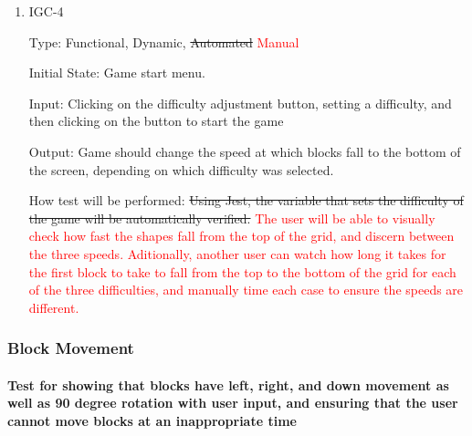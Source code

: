 \documentclass[12pt, titlepage]{article}
\begin{document}
\begin{enumerate}
\item{IGC-4\\}

Type: Functional, Dynamic, \sout{Automated} \textcolor{red}{Manual}
					
Initial State: Game start menu.
					
Input: Clicking on the difficulty adjustment button, setting a difficulty, and then clicking on the button to start the game
					
Output: Game should change the speed at which blocks fall to the bottom of the screen, depending on which difficulty was selected.
					
How test will be performed: \sout{Using Jest, the variable that sets the difficulty of the game will be automatically verified.} \textcolor{red}{The user will be able to visually check how fast the shapes fall from the top of the grid, and discern between the three speeds. Aditionally, another user can watch how long it takes for the first block to take to fall from the top to the bottom of the grid for each of the three difficulties, and manually time each case to ensure the speeds are different.}

\end{enumerate}
\subsubsection{Block Movement}
\paragraph{Test for showing that blocks have left, right, and down movement as well as 90 degree rotation with user input, and ensuring that the user cannot move blocks at an inappropriate time}
\end{document}
